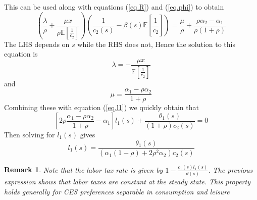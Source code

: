 \documentclass[thmsb,11pt]{article}
\newtheorem{remark}{Remark}
\begin{document}
\begin{appendix}
\begin{equation*}
\end{equation*}%
This can be used along with equations (\ref{eq.R}) and (\ref{eq.phi}) to
obtain
\begin{equation*}
\left(\frac\lambda \rho+\frac{\mu x}{\rho\mathbb{E}[\frac1{c_2}]}%
\right)\left(\frac1{c_2(s)}-\beta(s)\mathbb{E}\left[\frac1{c_2}\right]%
\right) = \frac{\mu}{\rho}+\frac{\rho\alpha_2-\alpha_1}{\rho(1+\rho)}
\end{equation*}
The LHS depends on $s$ while the RHS does not, Hence the solution to
this equation is
\begin{equation}
\lambda = - \frac{\mu x}{\mathbb{E}[\frac1{c_2}]}
\end{equation}%
and
\begin{equation}
\mu = \frac{\alpha_1-\rho\alpha_2}{1+\rho}  \label{eq.mu}
\end{equation}
Combining these with equation (\ref{eq.l1}) we quickly obtain that
\begin{equation*}
\left[2\rho\frac{\alpha_1-\rho\alpha_2}{1+\rho}-\alpha_1\right]%
l_1(s)+\frac{\theta_1(s)}{\left(1+\rho\right)c_2(s)} = 0
\end{equation*}%
Then solving for $l_1(s)$ gives
\begin{equation*}
l_1(s) = \frac{\theta_1(s)}{\left(\alpha_1(1-\rho)+2\rho^2\alpha_2\right)c_2(s)}
\end{equation*}

\begin{remark}
Note that the labor tax rate is given by $1-\frac{c_1(s)l_1(s)}{\theta(s)}$. The previous expression shows that labor taxes are constant at the steady state. This property holds generally for CES preferences separable in consumption and leisure
\end{remark}


\end{appendix}
\end{document}
